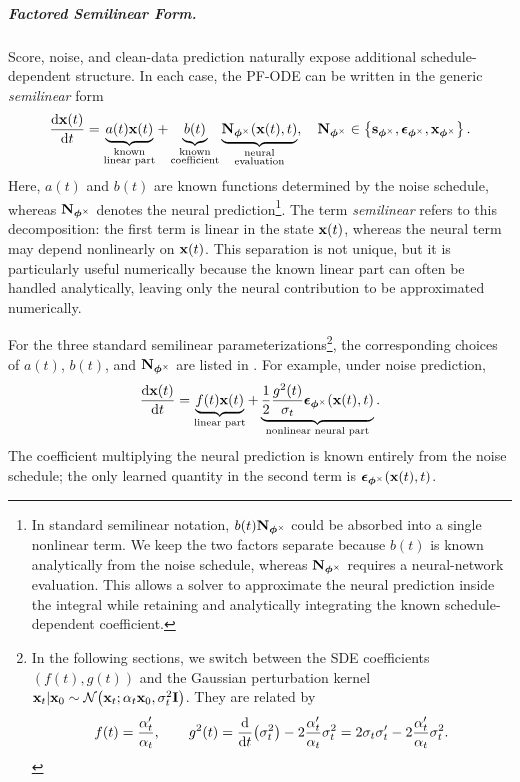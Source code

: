 \subparagraph{Factored Semilinear Form.}
Score, noise, and clean-data prediction naturally expose additional
schedule-dependent structure. In each case, the PF-ODE can be written in the
generic \emph{semilinear} form
\begin{equation}
\label{eq:general-semilinear-pfode}
\frac{\mathop{}\!\mathrm{d}{\mathbf{x}}(t)}{\mathop{}\!\mathrm{d} t}
=
\underbrace{
a(t){\mathbf{x}}(t)
}_{\substack{\text{known}\\\text{linear part}}}
+
\underbrace{
b(t)
}_{\substack{\text{known}\\\text{coefficient}}}
\underbrace{
{\mathbf{N}}_{\bm{\phi}^\times}({\mathbf{x}}(t),t)
}_{\substack{\text{neural}\\\text{evaluation}}},
\quad
{\mathbf{N}}_{\bm{\phi}^\times}
\in
\left\{
{\mathbf{s}}_{\bm{\phi}^\times},
{\bm{\epsilon}}_{\bm{\phi}^\times},
{\mathbf{x}}_{\bm{\phi}^\times}
\right\}.
\end{equation}
Here, $a(t)$ and $b(t)$ are known functions determined by the noise schedule,
whereas ${\mathbf{N}}_{\bm{\phi}^\times}$ denotes the neural prediction\footnote{In
standard semilinear notation, $b(t){\mathbf{N}}_{\bm{\phi}^\times}$ could be absorbed
into a single nonlinear term. We keep the two factors separate because $b(t)$
is known analytically from the noise schedule, whereas
${\mathbf{N}}_{\bm{\phi}^\times}$ requires a neural-network evaluation. This allows a
solver to approximate the neural prediction inside the integral while retaining
and analytically integrating the known schedule-dependent coefficient.}. The term
\emph{semilinear} refers to this decomposition: the first term is linear in the
state ${\mathbf{x}}(t)$, whereas the neural term may depend nonlinearly on ${\mathbf{x}}(t)$.
This separation is not unique, but it is particularly useful numerically because
the known linear part can often be handled analytically, leaving only the neural
contribution to be approximated numerically.

For the three standard semilinear parameterizations\footnote{In the following
sections, we switch between the SDE coefficients $(f(t),g(t))$ and the Gaussian
perturbation kernel ${\mathbf{x}}_t | {\mathbf{x}}_0
    \sim
    \mathcal{N}
    \bigl(
        {\mathbf{x}}_t;
        \alpha_t{\mathbf{x}}_0,
        \sigma_t^2{\mathbf{I}}
    \bigr)$.
They are related by
\[
    f(t)
    =
    \frac{\alpha_t'}{\alpha_t},
    \qquad
    g^2(t)
    =
    \frac{\mathop{}\!\mathrm{d}}{\mathop{}\!\mathrm{d} t}\bigl(\sigma_t^2\bigr)
    -
    2\frac{\alpha_t'}{\alpha_t}\sigma_t^2
    =
    2\sigma_t\sigma_t'
    -
    2\frac{\alpha_t'}{\alpha_t}\sigma_t^2.
\]
}, the corresponding choices of $a(t)$, $b(t)$, and
${\mathbf{N}}_{\bm{\phi}^\times}$ are listed in . For example, under noise prediction,
\begin{equation}
\label{eq:noise_pf_ode}
\frac{\mathop{}\!\mathrm{d}{\mathbf{x}}(t)}{\mathop{}\!\mathrm{d} t}
=
\underbrace{
f(t){\mathbf{x}}(t)
}_{\text{linear part}}
+
\underbrace{
\frac{1}{2}\frac{g^2(t)}{\sigma_t}
{\bm{\epsilon}}_{\bm{\phi}^\times}({\mathbf{x}}(t),t)
}_{\text{nonlinear neural part}}.
\end{equation}
The coefficient multiplying the neural prediction is known entirely from the
noise schedule; the only learned quantity in the second term is
${\bm{\epsilon}}_{\bm{\phi}^\times}({\mathbf{x}}(t),t)$.

